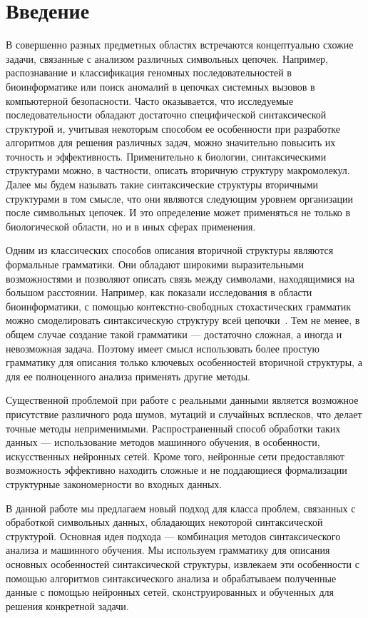 \documentclass[14pt]{matmex-diploma-custom}
\begin{document}
\section*{Введение}
В совершенно разных предметных областях встречаются концептуально схожие задачи, связанные с анализом различных символьных цепочек. Например, распознавание и классификация геномных последовательностей в биоинформатике или поиск аномалий в цепочках системных вызовов в компьютерной безопасности. Часто оказывается, что исследуемые последовательности обладают достаточно специфической синтаксической структурой и, учитывая некоторым способом ее особенности при разработке алгоритмов для решения различных задач, можно значительно повысить их точность и эффективность. Применительно к биологии, синтаксическими структурами можно, в частности, описать вторичную структуру макромолекул. Далее мы будем называть такие синтаксические структуры вторичными структурами в том смысле, что они являются следующим уровнем организации после символьных цепочек. И это определение может применяться не только в биологической области, но и в иных сферах применения.
 
Одним из классических способов описания вторичной структуры являются формальные грамматики. Они обладают широкими выразительными возможностями и позволяют описать связь между символами, находящимися на большом расстоянии. Например, как показали исследования в области биоинформатики, с помощью контекстно-свободных стохастических грамматик можно смоделировать синтаксическую структуру всей цепочки~\cite{PCFG,dowell2004rna}. Тем не менее, в общем случае создание такой грамматики --- достаточно сложная, а иногда и невозможная задача. Поэтому имеет смысл использовать более простую грамматику для описания только ключевых особенностей вторичной структуры, а для ее полноценного анализа применять другие методы.

Существенной проблемой при работе с реальными данными является возможное присутствие различного рода шумов, мутаций и случайных всплесков, что делает точные методы неприменимыми. Распространенный способ обработки таких данных --- использование методов машинного обучения, в особенности, искусственных нейронных сетей. Кроме того, нейронные сети предоставляют возможность эффективно находить сложные и не поддающиеся формализации структурные закономерности во входных данных.

В данной работе мы предлагаем новый подход для класса проблем, связанных с обработкой символьных данных, обладающих некоторой синтаксической структурой. Основная идея подхода --- комбинация методов синтаксического анализа и машинного обучения. Мы используем грамматику для описания основных особенностей синтаксической структуры, извлекаем эти особенности с помощью алгоритмов синтаксического анализа и обрабатываем полученные данные с помощью нейронных сетей, сконструированных и обученных для решения конкретной задачи. 
\end{document}
